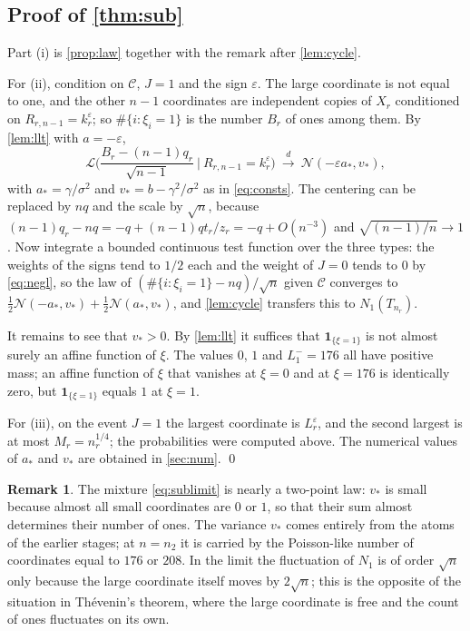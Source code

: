 \documentclass[11pt]{amsart}
\theoremstyle{definition}
\newtheorem{remark}[theorem]{Remark}
\newcommand{\Law}{\mathcal{L}}
\newcommand{\Nor}{\mathcal{N}}
\newcommand{\Cond}{\mathcal{C}}
\newcommand{\Ind}{\mathbf{1}}
\begin{document}
\subsection{Proof of \cref{thm:sub}}

Part (i) is \cref{prop:law} together with the remark after \cref{lem:cycle}.

For (ii), condition on $\Cond$, $J=1$ and the sign $\varepsilon$. The large coordinate is not equal to one, and the other $n-1$ coordinates are independent copies of $X_r$ conditioned on $R_{r,n-1}=k_r^\varepsilon$; so $\#\{i:\xi_i=1\}$ is the number $B_r$ of ones among them. By \cref{lem:llt} with $a=-\varepsilon$,
\[
\Law\Big(\frac{B_r-(n-1)q_r}{\sqrt{n-1}}\ \Big|\ R_{r,n-1}=k_r^\varepsilon\Big)\ \xrightarrow{d}\ \Nor(-\varepsilon a_*,v_*),
\]
with $a_*=\gamma/\sigma^2$ and $v_*=b-\gamma^2/\sigma^2$ as in \eqref{eq:consts}. The centering can be replaced by $nq$ and the scale by $\sqrt n$, because $(n-1)q_r-nq=-q+(n-1)qt_r/z_r=-q+O(n^{-3})$ and $\sqrt{(n-1)/n}\to1$. Now integrate a bounded continuous test function over the three types: the weights of the signs tend to $1/2$ each and the weight of $J=0$ tends to $0$ by \eqref{eq:negl}, so the law of $(\#\{i:\xi_i=1\}-nq)/\sqrt n$ given $\Cond$ converges to $\tfrac12\Nor(-a_*,v_*)+\tfrac12\Nor(a_*,v_*)$, and \cref{lem:cycle} transfers this to $N_1(T_{n_r})$.

It remains to see that $v_*>0$. By \cref{lem:llt} it suffices that $\Ind_{\{\xi=1\}}$ is not almost surely an affine function of $\xi$. The values $0$, $1$ and $L_1^-=176$ all have positive mass; an affine function of $\xi$ that vanishes at $\xi=0$ and at $\xi=176$ is identically zero, but $\Ind_{\{\xi=1\}}$ equals $1$ at $\xi=1$.

For (iii), on the event $J=1$ the largest coordinate is $L_r^\varepsilon$, and the second largest is at most $M_r=n_r^{1/4}$; the probabilities were computed above. The numerical values of $a_*$ and $v_*$ are obtained in \cref{sec:num}. \qed

\begin{remark}
The mixture \eqref{eq:sublimit} is nearly a two-point law: $v_*$ is small because almost all small coordinates are $0$ or $1$, so that their sum almost determines their number of ones. The variance $v_*$ comes entirely from the atoms of the earlier stages; at $n=n_2$ it is carried by the Poisson-like number of coordinates equal to $176$ or $208$. In the limit the fluctuation of $N_1$ is of order $\sqrt n$ only because the large coordinate itself moves by $2\sqrt n$; this is the opposite of the situation in Th\'evenin's theorem, where the large coordinate is free and the count of ones fluctuates on its own.
\end{remark}
\end{document}
